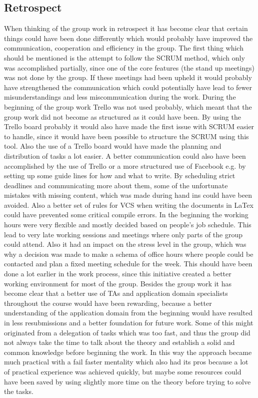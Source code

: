 \subsection{Retrospect}
When thinking of the group work in retrospect it has become clear that certain things could have been done differently which would probably have improved the communication, cooperation and efficiency in the group.
The first thing which should be mentioned is the attempt to follow the SCRUM method, which only was accomplished partially, since one of the core features (the stand up meetings) was not done by the group. If these meetings had been upheld it would probably have strengthened the communication which could potentially have lead to fewer misunderstandings and less miscommunication during the work.
During the beginning of the group work Trello was not used probably, which meant that the group work did not become as structured as it could have been. By using the Trello board probably it would also have made the first issue with SCRUM easier to handle, since it would have been possible to structure the SCRUM using this tool. Also the use of a Trello board would have made the planning and distribution of tasks a lot easier.
A better communication could also have been accomplished by the use of Trello or a more structured use of Facebook e.g. by setting up some guide lines for how and what to write. By scheduling strict deadlines and communicating more about them, some of the unfortunate mistakes with missing content, which was made during hand ins could have been avoided. Also a better set of rules for VCS when writing the documents in LaTex could have prevented some critical compile errors.
In the beginning the working hours were very flexible and mostly decided based on people's job schedule. This lead to very late working sessions and meetings where only parts of the group could attend. Also it had an impact on the stress level in the group, which was why a decision was made to make a schema of office hours where people could be contacted and plan a fixed meeting schedule for the week. This should have been done a lot earlier in the work process, since this initiative created a better working environment for most of the group.
Besides the group work it has become clear that a better use of TAs and application domain specialists throughout the course would have been rewarding, because a better understanding of the application domain from the beginning would have resulted in less resubmissions and a better foundation for future work. Some of this might originated from a delegation of tasks which was too fast, and thus the group did not always take the time to talk about the theory and establish a solid and common knowledge before beginning the work. In this way the approach became much practical with a fail faster mentality which also had its pros because a lot of practical experience was achieved quickly, but maybe some resources could have been saved by using slightly more time on the theory before trying to solve the tasks.

